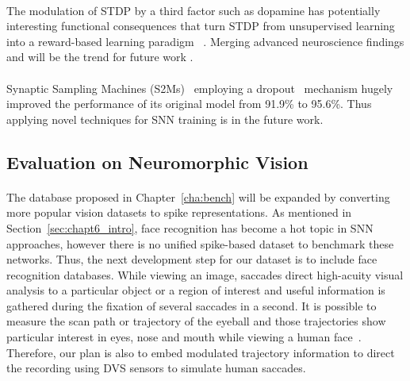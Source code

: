 \paragraph{}
\DIFaddend The modulation of STDP by a third factor such as dopamine has potentially interesting functional consequences that turn STDP from unsupervised learning into a reward-based learning paradigm~\citep{izhikevich2007solving} \DIFdelbegin {}\DIFdelend \DIFaddbegin {}\DIFaddend .
Merging advanced neuroscience findings and \DIFdelbegin {}\DIFdelend \DIFaddbegin {}\DIFaddend will be the trend for future work \DIFaddbegin {}\DIFaddend .


\DIFaddbegin \paragraph{}
\DIFaddend Synaptic Sampling Machines (S2Ms)~\citep{neftci2016stochastic} employing a dropout~\citep{srivastava2014dropout} mechanism \DIFaddbegin {}\DIFaddend hugely improved the performance of its original model from 91.9\% to 95.6\%.
Thus applying novel \DIFdelbegin {}\DIFdelend \DIFaddbegin {}\DIFaddend techniques for SNN training is \DIFaddbegin {}\DIFaddend in the future work.


\subsection{Evaluation on Neuromorphic Vision}
\DIFaddbegin 

\paragraph{}
\DIFaddend The database proposed in Chapter~\ref{cha:bench} will be expanded by converting more popular vision datasets to spike representations.
As mentioned in Section~\ref{sec:chapt6_intro}, face recognition has become a hot topic in SNN approaches, however there is no unified spike-based dataset to benchmark these networks.
Thus, the next development step for our dataset is to include face recognition databases.
While viewing an image, saccades direct high-acuity visual analysis to a particular object or a region of interest and useful information is gathered during the fixation of several saccades in a second.
It is possible to measure the scan path or trajectory of the eyeball and those trajectories show particular interest in eyes, nose and mouth while viewing a human face~\citep{yarbus1967eye}.
Therefore, our plan is also to embed modulated trajectory information to direct the recording using DVS sensors to simulate human saccades.

